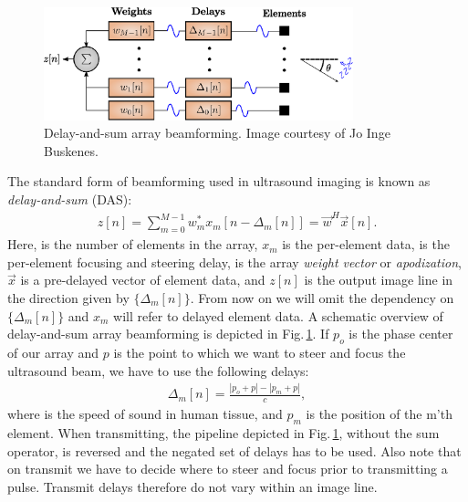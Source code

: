 \begin{figure}
\centering
\includegraphics[width=0.8\textwidth]{img/beamforming_das.eps}
\caption{Delay-and-sum array beamforming. Image courtesy of Jo Inge Buskenes.}
\label{fig:das_background}
\end{figure}

The standard form of beamforming used in ultrasound imaging is known as \textit{delay-and-sum} (DAS): 
\begin{align}\label{eq:das_background}
z[n] = \sum_{m = 0}^{M-1}w_m^*x_m[n - \Delta_m[n]] = \vec{w}^H\vec{x}[n].
\end{align}
Here,  is the number of elements in the array, $x_m$ is the per-element data,  is the per-element focusing and steering delay,  is the array \textit{weight vector} or \textit{apodization}, $\vec{x}$ is a pre-delayed vector of element data, and $z[n]$ is the output image line in the direction given by $\{\Delta_m[n]\}$.  From now on we will omit the dependency on $\{\Delta_m[n]\}$ and $x_m$ will refer to delayed element data. A schematic overview of delay-and-sum array beamforming is depicted in Fig.\,\ref{fig:das_background}. If $p_o$ is the phase center of our array and $p$ is the point to which we want to steer and focus the ultrasound beam, we have to use the following delays:
\begin{align}
\Delta_m[n] =\frac{|p_o+p| - |p_m+p|}{c},
\end{align}
where  is the speed of sound in human tissue, and $p_m$ is the position of the m'th element. When transmitting, the pipeline depicted in Fig.\,\ref{fig:das_background}, without the sum operator, is reversed and the negated set of delays has to be used. Also note that on transmit we have to decide where to steer and focus prior to transmitting a pulse. Transmit delays therefore do not vary within an image line.

